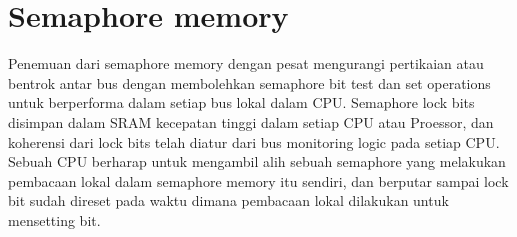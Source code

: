 \section{Semaphore memory}
\cite{earnshaw1991semaphore}Penemuan dari semaphore memory dengan pesat mengurangi pertikaian atau bentrok antar bus dengan membolehkan semaphore bit test dan set operations untuk berperforma dalam setiap bus lokal dalam CPU. Semaphore lock bits disimpan dalam SRAM kecepatan tinggi dalam setiap CPU atau Proessor, dan koherensi dari 
lock bits telah diatur dari bus monitoring logic pada setiap CPU. Sebuah CPU berharap untuk mengambil alih sebuah semaphore yang melakukan pembacaan lokal dalam semaphore memory itu sendiri, dan berputar sampai lock bit sudah direset pada waktu dimana pembacaan lokal dilakukan untuk mensetting bit.